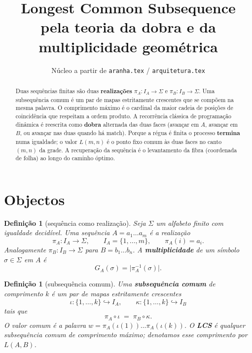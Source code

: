 \documentclass[11pt,a4paper]{article}
\newtheorem{definicao}[teorema]{Definição}
\begin{document}
\title{Longest Common Subsequence\\[0.4em]
\large pela teoria da dobra e da multiplicidade geométrica}
\author{Núcleo a partir de \texttt{aranha.tex} / \texttt{arquitetura.tex}}
\date{}
\maketitle

\begin{abstract}
\noindent Duas sequências finitas são duas \textbf{realizações}
$\pi_A\colon I_A\to\Sigma$ e $\pi_B\colon I_B\to\Sigma$.
Uma subsequência comum é um par de mapas estritamente crescentes
que se compõem na mesma palavra. O comprimento máximo é o cardinal
da maior cadeia de posições de coincidência que respeitam a ordem
produto. A recorrência clássica de programação dinâmica é reescrita
como \textbf{dobra} alternada das duas faces (avançar em $A$, avançar
em $B$, ou avançar nas duas quando há match). Porque a régua é finita
o processo \textbf{termina} numa igualdade; o valor $L(m,n)$ é o
ponto fixo comum às duas faces no canto $(m,n)$ da grade.
A recuperação da sequência é o levantamento da fibra (coordenada de
folha) ao longo do caminho óptimo.
\end{abstract}

\section{Objectos}

\begin{definicao}[sequência como realização]
Seja $\Sigma$ um alfabeto finito com igualdade decidível.
Uma sequência $A=a_1\dots a_m$ é a realização
\[
\pi_A\colon I_A\to\Sigma,\qquad
I_A=\{1,\dots,m\},\qquad
\pi_A(i)=a_i.
\]
Analogamente $\pi_B\colon I_B\to\Sigma$ para $B=b_1\dots b_n$.
A \textbf{multiplicidade} de um símbolo $\sigma\in\Sigma$ em $A$ é
\[
G_A(\sigma)=\bigl\lvert\pi_A^{-1}(\sigma)\bigr\rvert.
\]
\end{definicao}

\begin{definicao}[subsequência comum]
Uma \textbf{subsequência comum} de comprimento $k$ é um par de mapas
estritamente crescentes
\[
\iota\colon\{1,\dots,k\}\hookrightarrow I_A,\qquad
\kappa\colon\{1,\dots,k\}\hookrightarrow I_B
\]
tais que
\[
\pi_A\circ\iota \;=\; \pi_B\circ\kappa.
\]
O valor comum é a palavra $w=\pi_A(\iota(1))\dots\pi_A(\iota(k))$.
O \textbf{LCS} é qualquer subsequência comum de comprimento máximo;
denotamos esse comprimento por $L(A,B)$.
\end{definicao}
\end{document}
